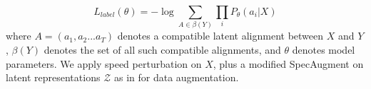 \documentclass[a4paper]{article}
\begin{document}
\vspace{-1mm}
\begin{equation}
    L_{label}(\theta)=-\log \sum_{A \in \beta(Y)} \prod_{i} P_{\theta}(a_{i}|X)
    \label{eq:ctc_label}
\end{equation}
where $A=(a_1, a_2 ... a_T)$ denotes a compatible latent alignment between $X$ and $Y$, $\beta(Y)$ denotes the set of all such compatible alignments, and $\theta$ denotes model parameters. We apply speed perturbation \cite{ko15_interspeech} on $X$, plus a modified SpecAugment on latent representations $\mathcal{Z}$ as in \cite{baevski2020wav2vec} for data augmentation.

\end{document}

